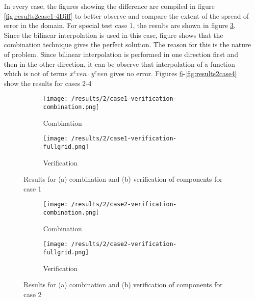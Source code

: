 In every case, the figures showing the difference are compiled in figure \ref{fig:results2case1-4Diff} to better observe and compare the extent of the spread of error in the domain. For special test case 1, the results are shown in figure \ref{fig:results2case1}. Since the bilinear interpolation is used in this case, figure shows that the combination technique gives the perfect solution. The reason for this is the nature of problem. Since bilinear interpolation is performed in one direction first and then in the other direction, it can be observe that interpolation of a function which is not of terms $x^even \cdot y^even$ gives no error. Figures \ref{fig:results2case2}-\ref{fig:results2case4} show the results for cases 2-4
\begin{figure}[h]
	\centering
    \begin{subfigure}[b]{0.49\textwidth}
	    \texttt{[image: /results/2/case1-verification-combination.png]}
		\centering
        \caption{Combination}
        \label{fig:results2case1Combi}
    \end{subfigure} 
    \begin{subfigure}[b]{0.49\textwidth}    
	    \texttt{[image: /results/2/case1-verification-fullgrid.png]}
		\centering    
		 \caption{Verification}
	    \label{fig:results2case1Full}	 
    \end{subfigure} 
    \caption{Results for (a) combination and (b) verification of components for case 1}
    \label{fig:results2case1}
\end{figure}
\begin{figure}[h]
	\centering
    \begin{subfigure}[b]{0.49\textwidth}
	    \texttt{[image: /results/2/case2-verification-combination.png]}
		\centering
        \label{fig:results2case2Combi}
        \caption{Combination}
    \end{subfigure} 
    \begin{subfigure}[b]{0.49\textwidth}    
	    \texttt{[image: /results/2/case2-verification-fullgrid.png]}
		\centering    
	 \caption{Verification}
	    \label{fig:results2case2Full}	 	 
    \end{subfigure} 
    \caption{Results for (a) combination and (b) verification of components for case 2}
    \label{fig:results2case2}
\end{figure}
